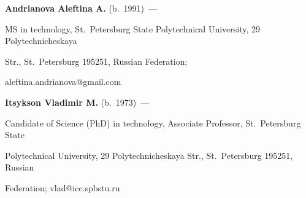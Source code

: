      \Contr





\noindent


\textbf{Andrianova Aleftina A.} (b.\ 1991)~---


MS in technology, St.\ Petersburg State Polytechnical University, 29 Polytechnicheskaya


Str., St.\ Petersburg 195251, Russian Federation;


 aleftina.andrianova@gmail.com





\vspace*{3pt}





\noindent


\textbf{Itsykson Vladimir M.} (b.\ 1973)~---


Candidate of Science (PhD) in technology, Associate Professor, St.\ Petersburg State


Polytechnical University, 29 Polytechnicheskaya Str., St.\ Petersburg 195251, Russian


Federation; vlad@icc.spbstu.ru





\label{end\stat}





\renewcommand{\bibname}{\protect\rmfamily Литература}


